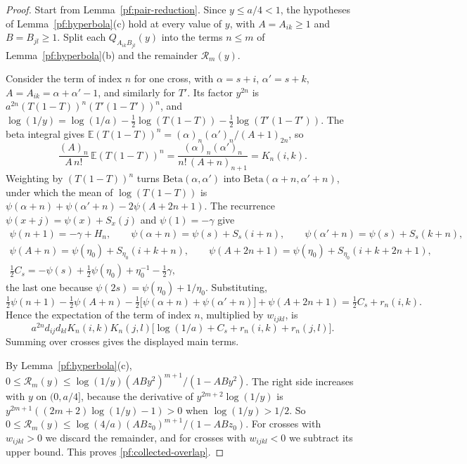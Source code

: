\begin{proof}
Start from Lemma~\ref{pf:pair-reduction}. Since $y\le a/4<1$, the
hypotheses of Lemma~\ref{pf:hyperbola}(c) hold at every value of $y$,
with $A=A_{ik}\ge1$ and $B=B_{jl}\ge1$. Split each
$Q_{A_{ik}B_{jl}}(y)$ into the terms $n\le m$ of
Lemma~\ref{pf:hyperbola}(b) and the remainder $\mathcal R_m(y)$.

Consider the term of index $n$ for one cross, with $\alpha=s+i$,
$\alpha'=s+k$, $A=A_{ik}=\alpha+\alpha'-1$, and similarly for $T'$. Its
factor $y^{2n}$ is $a^{2n}(T(1-T))^n(T'(1-T'))^n$, and
$\log(1/y)=\log(1/a)-\frac12\log(T(1-T))-\frac12\log(T'(1-T'))$. The
beta integral gives $\mathbb E(T(1-T))^n=(\alpha)_n(\alpha')_n/(A+1)_{2n}$,
so
\[
 \frac{(A)_n}{A\,n!}\,\mathbb E(T(1-T))^n
 =\frac{(\alpha)_n(\alpha')_n}{n!\,(A+n)_{n+1}}=K_n(i,k).
\]
Weighting by $(T(1-T))^n$ turns $\mathrm{Beta}(\alpha,\alpha')$ into
$\mathrm{Beta}(\alpha+n,\alpha'+n)$, under which the mean of
$\log(T(1-T))$ is $\psi(\alpha+n)+\psi(\alpha'+n)-2\psi(A+2n+1)$. The
recurrence $\psi(x+j)=\psi(x)+S_x(j)$ and $\psi(1)=-\gamma$ give
\[
 \begin{gathered}
 \psi(n+1)=-\gamma+H_n,\qquad
 \psi(\alpha+n)=\psi(s)+S_s(i+n),\qquad
 \psi(\alpha'+n)=\psi(s)+S_s(k+n),\\
 \psi(A+n)=\psi(\eta_0)+S_{\eta_0}(i+k+n),\qquad
 \psi(A+2n+1)=\psi(\eta_0)+S_{\eta_0}(i+k+2n+1),\\
 \tfrac12C_s=-\psi(s)+\tfrac12\psi(\eta_0)+\eta_0^{-1}-\tfrac12\gamma,
 \end{gathered}
\]
the last one because $\psi(2s)=\psi(\eta_0)+1/\eta_0$. Substituting,
\[
 \tfrac12\psi(n+1)-\tfrac12\psi(A+n)
 -\tfrac12\bigl[\psi(\alpha+n)+\psi(\alpha'+n)\bigr]+\psi(A+2n+1)
 =\tfrac12C_s+r_n(i,k).
\]
Hence the expectation of the term of index $n$, multiplied by
$w_{ijkl}$, is
\[
 a^{2n}d_{ij}d_{kl}K_n(i,k)K_n(j,l)\bigl[\log(1/a)+C_s+r_n(i,k)
 +r_n(j,l)\bigr].
\]
Summing over crosses gives the displayed main terms.

By Lemma~\ref{pf:hyperbola}(c),
$0\le\mathcal R_m(y)\le\log(1/y)(ABy^2)^{m+1}/(1-ABy^2)$. The right side
increases with $y$ on $(0,a/4]$, because the derivative of
$y^{2m+2}\log(1/y)$ is $y^{2m+1}((2m+2)\log(1/y)-1)>0$ when
$\log(1/y)>1/2$. So
$0\le\mathcal R_m(y)\le\log(4/a)(ABz_0)^{m+1}/(1-ABz_0)$. For crosses
with $w_{ijkl}>0$ we discard the remainder, and for crosses with
$w_{ijkl}<0$ we subtract its upper bound. This proves
\eqref{pf:collected-overlap}.
\end{proof}

